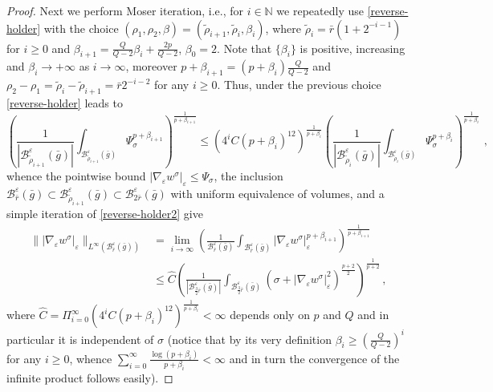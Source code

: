 \documentclass[10pt]{amsart}
\numberwithin{equation}{section}
\theoremstyle{definition}
\begin{document}
\begin{proof}
Next we perform Moser iteration, i.e., for $i \in \mathbb{N}$ we repeatedly use \eqref{reverse-holder} with the choice $(\rho_1,\rho_2,\beta)=(\tilde{\rho}_{i+1}, \tilde{\rho}_i,\beta_i)$, where $\tilde{\rho}_i=\bar{r}(1+2^{-i-1})$ for $i \geq 0$ and $\beta_{i+1}=\frac{Q}{Q-2} \beta_i+\frac{2p}{Q-2}$, $\beta_0=2$. Note that $\{ \beta_i\}$ is positive, increasing and $\beta_i \to +\infty$ as $i \to \infty$, moreover $p+\beta_{i+1}=(p+\beta_i) \frac{Q}{Q-2}$ and $\rho_2 -\rho_1= \tilde{\rho}_i - \tilde{\rho}_{i+1}= \bar{r} 2^{-i-2}$ for any $i \geq 0$. Thus, under the previous choice \eqref{reverse-holder} leads to
\begin{equation}
\label{reverse-holder2}
\left( \frac{1}{|\mathcal{B}^\varepsilon_{\tilde{\rho}_{i+1}}(\bar{g})|}\int_{\mathcal{B}^\varepsilon_{\tilde{\rho}_{i+1}}(\bar{g})}   \Psi_\sigma^{p+\beta_{i+1}}  \right)^{\frac{1}{p+\beta_{i+1}}} \leq \left( 4^i C (p+\beta_i)^{12} \right)^{\frac{1}{p+\beta_i}}  \left( \frac{1}{|\mathcal{B}^\varepsilon_{\tilde{\rho}_i}(\bar{g})|}\int_{ \mathcal{B}_{ \tilde{\rho}_i}^\varepsilon(\bar{g})} \Psi_\sigma^{p+\beta_i}  \right)^{\frac{1}{p+\beta_i}}\, 
\, ,
\end{equation}
whence the pointwise bound $|\nabla_\varepsilon w^\sigma|_\varepsilon  \leq \Psi_\sigma$, the inclusion $\mathcal{B}^\varepsilon_{\bar{r}}(\bar{g}) \subset \mathcal{B}^\varepsilon_{\tilde{\rho}_{i+1}}(\bar{g}) \subset \mathcal{B}^\varepsilon_{2\bar{r}}(\bar{g}) $  with uniform equivalence of volumes, and a simple iteration of \eqref{reverse-holder2} give 
 \begin{equation}
\label{capogna-citti-bound-fake} 
\begin{aligned}
\| |\nabla_\varepsilon w^\sigma|_\varepsilon  \|_{L^\infty(\mathcal{B}^\varepsilon_{\bar{r}}(\bar{g}))} &= \lim_{i \to \infty}   \left( \frac{1}{\mathcal{B}^\varepsilon_{\bar{r}}(\bar{g})}\int_{\mathcal{B}^\varepsilon_{\bar{r}}(\bar{g})}   |\nabla_\varepsilon w^\sigma|_\varepsilon ^{p+\beta_{i+1}}  \right)^{\frac{1}{p+\beta_{i+1}}} \\
&\leq      \hat{C}  \left( \frac{1}{|\mathcal{B}_{ \frac32\bar{r}}^\varepsilon(\bar{g})|}  \int_{ \mathcal{B}_{\frac32\bar{r}}^\varepsilon(\bar{g})} \left(\sigma+|\nabla_\varepsilon w^\sigma |^2_\varepsilon\right)^{\frac{p+2}2} \right)^{\frac{1}{p+2}}\, , 
\end{aligned}
\end{equation}
where $\hat{C}=\Pi_{i=0}^\infty \left( 4^i C (p+\beta_i)^{12} \right)^{\frac{1}{p+\beta_i}} <\infty $ depends only on $p$ and $Q$ and in particular it is independent of $\sigma$ (notice that by its very definition $\beta_i \geq \left(\frac{Q}{Q-2} \right)^i$ for any $i \geq 0$, whence $\sum_{i=0}^\infty \frac{\log (p+\beta_i)}{p+\beta_i}<\infty$ and in turn the convergence of the infinite product follows easily). 


\end{proof}
\end{document}
